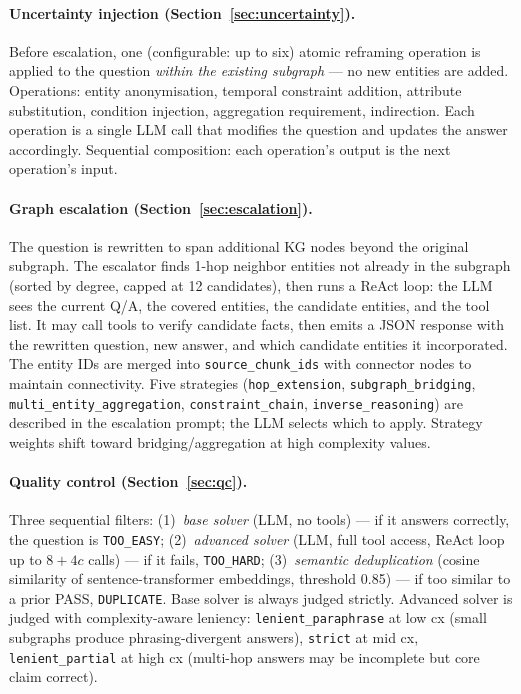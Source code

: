 \documentclass[11pt,a4paper]{article}
\begin{document}
\paragraph{Uncertainty injection (Section~\ref{sec:uncertainty}).}
Before escalation, one (configurable: up to six) atomic reframing operation is applied to the question \emph{within the existing subgraph} — no new entities are added. Operations: entity anonymisation, temporal constraint addition, attribute substitution, condition injection, aggregation requirement, indirection. Each operation is a single LLM call that modifies the question and updates the answer accordingly. Sequential composition: each operation's output is the next operation's input.

\paragraph{Graph escalation (Section~\ref{sec:escalation}).}
The question is rewritten to span additional KG nodes beyond the original subgraph. The escalator finds 1-hop neighbor entities not already in the subgraph (sorted by degree, capped at 12 candidates), then runs a ReAct loop: the LLM sees the current Q/A, the covered entities, the candidate entities, and the tool list. It may call tools to verify candidate facts, then emits a JSON response with the rewritten question, new answer, and which candidate entities it incorporated. The entity IDs are merged into \texttt{source\_chunk\_ids} with connector nodes to maintain connectivity. Five strategies (\texttt{hop\_extension}, \texttt{subgraph\_bridging}, \texttt{multi\_entity\_aggregation}, \texttt{constraint\_chain}, \texttt{inverse\_reasoning}) are described in the escalation prompt; the LLM selects which to apply. Strategy weights shift toward bridging/aggregation at high complexity values.

\paragraph{Quality control (Section~\ref{sec:qc}).}
Three sequential filters: (1)~\emph{base solver} (LLM, no tools) — if it answers correctly, the question is \texttt{TOO\_EASY}; (2)~\emph{advanced solver} (LLM, full tool access, ReAct loop up to $8+4c$ calls) — if it fails, \texttt{TOO\_HARD}; (3)~\emph{semantic deduplication} (cosine similarity of sentence-transformer embeddings, threshold 0.85) — if too similar to a prior PASS, \texttt{DUPLICATE}. Base solver is always judged strictly. Advanced solver is judged with complexity-aware leniency: \texttt{lenient\_paraphrase} at low cx (small subgraphs produce phrasing-divergent answers), \texttt{strict} at mid cx, \texttt{lenient\_partial} at high cx (multi-hop answers may be incomplete but core claim correct).
\end{document}
